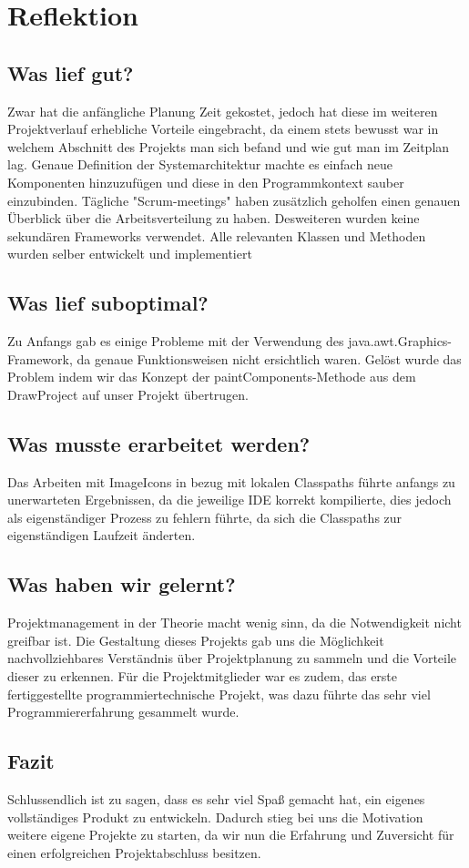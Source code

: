 \documentclass[12pt]{article}
\theoremstyle{plain}
\begin{document}
\section{Reflektion}
\subsection{Was lief gut?}
Zwar hat die anfängliche Planung Zeit gekostet, jedoch hat diese im weiteren Projektverlauf erhebliche Vorteile eingebracht, da einem stets bewusst war in welchem Abschnitt des Projekts man sich befand und wie gut man im Zeitplan lag. Genaue Definition der Systemarchitektur machte es einfach neue Komponenten hinzuzufügen und diese in den Programmkontext sauber einzubinden. Tägliche "Scrum-meetings" haben zusätzlich geholfen einen genauen Überblick über die Arbeitsverteilung zu haben.
Desweiteren wurden keine sekundären Frameworks verwendet. Alle relevanten Klassen und Methoden wurden selber entwickelt und implementiert
\subsection{Was lief suboptimal?}
Zu Anfangs gab es einige Probleme mit der Verwendung des java.awt.Graphics-Framework, da genaue Funktionsweisen nicht ersichtlich waren. Gelöst wurde das Problem indem wir das Konzept der paintComponents-Methode aus dem DrawProject auf unser Projekt übertrugen.
\subsection{Was musste erarbeitet werden?}
Das Arbeiten mit ImageIcons in bezug mit lokalen Classpaths führte anfangs zu unerwarteten Ergebnissen, da die jeweilige IDE korrekt kompilierte, dies jedoch als eigenständiger Prozess zu fehlern führte, da sich die Classpaths zur eigenständigen Laufzeit änderten.
\subsection{Was haben wir gelernt?}
Projektmanagement in der Theorie macht wenig sinn, da die Notwendigkeit nicht greifbar ist.
Die Gestaltung dieses Projekts gab uns die Möglichkeit nachvollziehbares Verständnis über Projektplanung zu sammeln und die Vorteile dieser zu erkennen. 
Für die Projektmitglieder war es zudem, das erste fertiggestellte programmiertechnische Projekt, was dazu führte das sehr viel Programmiererfahrung gesammelt wurde.
\subsection{Fazit}
Schlussendlich ist zu sagen, dass es sehr viel Spaß gemacht hat, ein eigenes vollständiges Produkt zu entwickeln. Dadurch stieg bei uns die Motivation weitere eigene Projekte zu starten, da wir nun die Erfahrung und Zuversicht für einen erfolgreichen Projektabschluss besitzen.
\end{document}
